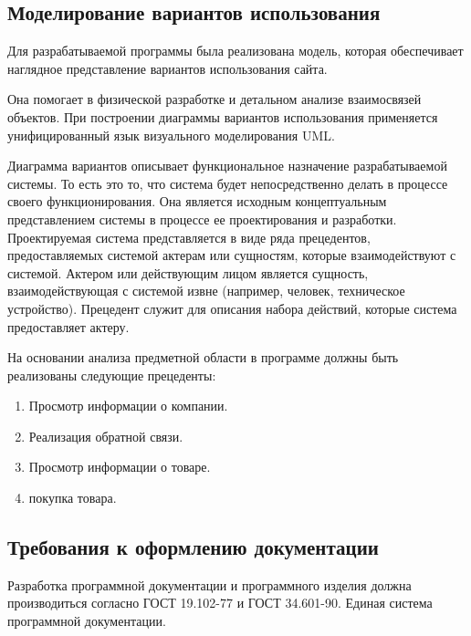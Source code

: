 \subsection{Моделирование вариантов использования}

Для разрабатываемой программы была реализована модель, которая обеспечивает наглядное представление вариантов использования сайта.

Она помогает в физической разработке и детальном анализе взаимосвязей объектов. При построении диаграммы вариантов использования применяется унифицированный язык визуального моделирования UML.

Диаграмма вариантов описывает функциональное назначение разрабатываемой системы. То есть это то, что система будет непосредственно делать в процессе своего функционирования. Она является исходным концептуальным представлением системы в процессе ее проектирования и разработки. Проектируемая система представляется в виде ряда прецедентов, предоставляемых системой актерам или сущностям, которые взаимодействуют с системой. Актером или действующим лицом является сущность, взаимодействующая с системой извне (например, человек, техническое устройство). Прецедент служит для описания набора действий, которые система предоставляет актеру.

На основании анализа предметной области в программе должны быть реализованы следующие прецеденты:
\begin{enumerate}
	\item Просмотр информации о компании.
	\item Реализация обратной связи.
	\item Просмотр информации о товаре.
	\item покупка товара.
\end{enumerate}

\subsection{Требования к оформлению документации}

Разработка программной документации и программного изделия должна производиться согласно ГОСТ 19.102-77 и ГОСТ 34.601-90. Единая система программной документации.
